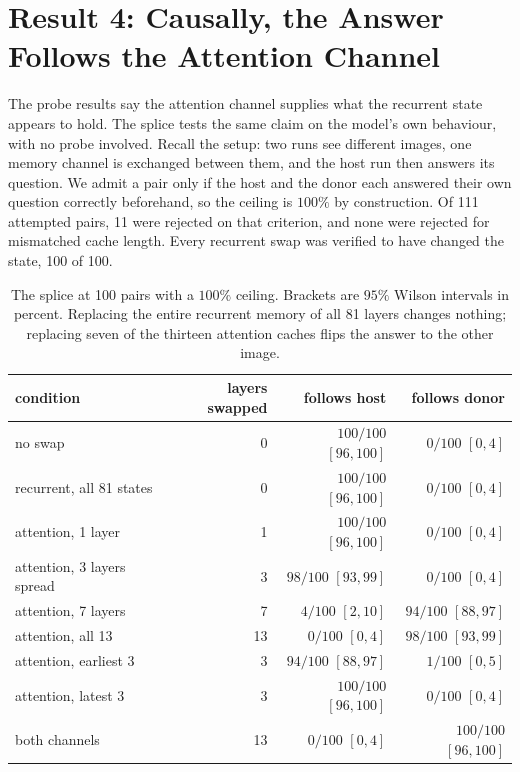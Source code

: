 \documentclass[10pt]{article}
\begin{document}
\section{Result 4: Causally, the Answer Follows the Attention Channel}

The probe results say the attention channel supplies what the recurrent state
appears to hold. The splice tests the same claim on the model's own behaviour,
with no probe involved. Recall the setup: two runs see different images, one
memory channel is exchanged between them, and the host run then answers its
question. We admit a pair only if the host and the donor each answered their
own question correctly beforehand, so the ceiling is $100\%$ by construction.
Of 111 attempted pairs, 11 were rejected on that criterion, and none were
rejected for mismatched cache length. Every recurrent swap was verified to
have changed the state, 100 of 100.

\begin{table}[h]
\centering\small
\begin{tabular}{lrrr}
\toprule
condition & layers swapped & follows host & follows donor \\
\midrule
no swap                       & 0  & $100/100$ $[96,100]$ & $0/100$ $[0,4]$ \\
recurrent, all 81 states      & 0  & $100/100$ $[96,100]$ & $0/100$ $[0,4]$ \\
\addlinespace
attention, 1 layer            & 1  & $100/100$ $[96,100]$ & $0/100$ $[0,4]$ \\
attention, 3 layers spread    & 3  & $98/100$ $[93,99]$   & $0/100$ $[0,4]$ \\
attention, 7 layers           & 7  & $4/100$ $[2,10]$     & $94/100$ $[88,97]$ \\
attention, all 13             & 13 & $0/100$ $[0,4]$      & $98/100$ $[93,99]$ \\
\addlinespace
attention, earliest 3         & 3  & $94/100$ $[88,97]$   & $1/100$ $[0,5]$ \\
attention, latest 3           & 3  & $100/100$ $[96,100]$ & $0/100$ $[0,4]$ \\
both channels                 & 13 & $0/100$ $[0,4]$      & $100/100$ $[96,100]$ \\
\bottomrule
\end{tabular}
\caption{The splice at 100 pairs with a $100\%$ ceiling. Brackets are $95\%$
Wilson intervals in percent. Replacing the entire recurrent memory of all 81
layers changes nothing; replacing seven of the thirteen attention caches flips
the answer to the other image.}
\label{tab:splice}
\end{table}
\end{document}

